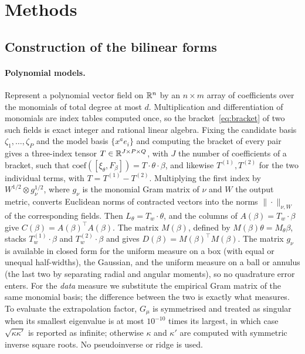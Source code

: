 \section{Methods}
\label{sec:methods}

\subsection{Construction of the bilinear forms}
\label{app:construction}

\paragraph{Polynomial models.} Represent a polynomial vector field on $\mathbb{R}^n$ by
an $n \times m$ array of coefficients over the monomials of total degree at
most $d$. Multiplication and differentiation of monomials are index tables
computed once, so the bracket~\eqref{eq:bracket} of two such fields is exact
integer and rational linear algebra. Fixing the candidate basis
$\zeta_1,\dots,\zeta_P$ and the model basis $\{x^a e_i\}$ and computing the
bracket of every pair gives a three-index tensor $T \in \mathbb{R}^{J \times P \times
Q}$, with $J$ the number of coefficients of a bracket, such that
$\mathrm{coef}([\xi_\theta,F_\beta]) = T \cdot \theta \cdot \beta$, and likewise
$T^{(1)}, T^{(2)}$ for the two individual terms, with $T = T^{(1)}-T^{(2)}$.
Multiplying the first index by $W^{1/2} \otimes g_\nu^{1/2}$, where $g_\nu$ is
the monomial Gram matrix of $\nu$ and $W$ the output metric, converts Euclidean
norms of contracted vectors into the norms $\|\cdot\|_{\nu,W}$ of the
corresponding fields. Then $L_\theta = T_w \cdot \theta$, and the columns of
$A(\beta) = T_w \cdot \beta$ give $C(\beta) = A(\beta)^{\!\top}A(\beta)$.
The matrix $M(\beta)$, defined by $M(\beta)\theta = M_\theta\beta$, stacks
$T^{(1)}_w\cdot\beta$ and $T^{(2)}_w\cdot\beta$ and gives $D(\beta) =
M(\beta)^{\!\top}M(\beta)$. The matrix
$g_\nu$ is available in closed form for the uniform measure on a box (with
equal or unequal half-widths), the Gaussian, and the uniform measure on a ball
or annulus (the last two by separating radial and angular moments), so no
quadrature error enters. For the \emph{data} measure we substitute the
empirical Gram matrix of the same monomial basis; the difference between the
two is exactly what  measures. To evaluate the extrapolation
factor, $G_\mu$ is symmetrised and treated as singular when its smallest
eigenvalue is at most $10^{-10}$ times its largest, in which case
$\sqrt{\kappa\kappa'}$ is reported as infinite; otherwise $\kappa$ and
$\kappa'$ are computed with symmetric inverse square roots. No pseudoinverse or
ridge is used.

